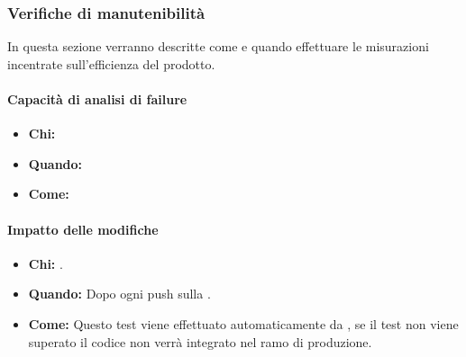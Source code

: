 \newpage
\subsubsection{Verifiche di manutenibilità}
In questa sezione verranno descritte come e quando effettuare le misurazioni incentrate sull'efficienza del prodotto.

\paragraph{Capacità di analisi di failure}
\begin{itemize}
\item \textbf{Chi:}
\item \textbf{Quando:}
\item \textbf{Come:}
\end{itemize}

\paragraph{Impatto delle modifiche}
\begin{itemize}
\item \textbf{Chi:} .
\item \textbf{Quando:} Dopo ogni push sulla .
\item \textbf{Come:} Questo test viene effettuato automaticamente da , se il test non viene superato il codice non verrà integrato nel ramo di produzione.
\end{itemize}
